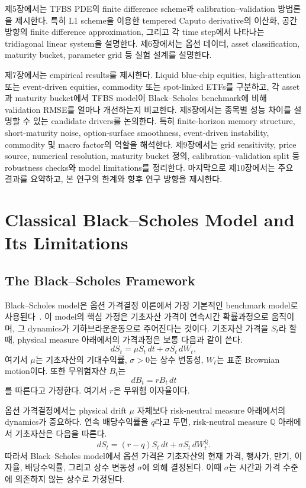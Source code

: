 \documentclass[11pt,a4paper]{report}
\begin{document}
제5장에서는 TFBS PDE의 finite difference scheme과 calibration--validation 방법론을 제시한다. 특히 L1 scheme을 이용한 tempered Caputo derivative의 이산화, 공간 방향의 finite difference approximation, 그리고 각 time step에서 나타나는 tridiagonal linear system을 설명한다. 제6장에서는 옵션 데이터, asset classification, maturity bucket, parameter grid 등 실험 설계를 설명한다.

제7장에서는 empirical results를 제시한다. Liquid blue-chip equities, high-attention 또는 event-driven equities, commodity 또는 spot-linked ETFs를 구분하고, 각 asset과 maturity bucket에서 TFBS model이 Black--Scholes benchmark에 비해 validation RMSE를 얼마나 개선하는지 비교한다. 제8장에서는 종목별 성능 차이를 설명할 수 있는 candidate drivers를 논의한다. 특히 finite-horizon memory structure, short-maturity noise, option-surface smoothness, event-driven instability, commodity 및 macro factor의 역할을 해석한다. 제9장에서는 grid sensitivity, price source, numerical resolution, maturity bucket 정의, calibration--validation split 등 robustness checks와 model limitations를 정리한다. 마지막으로 제10장에서는 주요 결과를 요약하고, 본 연구의 한계와 향후 연구 방향을 제시한다.

\chapter{Classical Black--Scholes Model and Its Limitations}

\section{The Black--Scholes Framework}

Black--Scholes model은 옵션 가격결정 이론에서 가장 기본적인 benchmark model로 사용된다~\cite{BlackScholes1973,Merton1973}. 이 model의 핵심 가정은 기초자산 가격이 연속시간 확률과정으로 움직이며, 그 dynamics가 기하브라운운동으로 주어진다는 것이다. 기초자산 가격을 $S_t$라 할 때, physical measure 아래에서의 가격과정은 보통 다음과 같이 쓴다.
\[
dS_t = \mu S_t\,dt + \sigma S_t\,dW_t,
\]
여기서 $\mu$는 기초자산의 기대수익률, $\sigma>0$는 상수 변동성, $W_t$는 표준 Brownian motion이다. 또한 무위험자산 $B_t$는
\[
dB_t = rB_t\,dt
\]
를 따른다고 가정한다. 여기서 $r$은 무위험 이자율이다.

옵션 가격결정에서는 physical drift $\mu$ 자체보다 risk-neutral measure 아래에서의 dynamics가 중요하다. 연속 배당수익률을 $q$라고 두면, risk-neutral measure $\mathbb{Q}$ 아래에서 기초자산은 다음을 따른다.
\[
dS_t = (r-q)S_t\,dt + \sigma S_t\,dW_t^{\mathbb{Q}}.
\]
따라서 Black--Scholes model에서 옵션 가격은 기초자산의 현재 가격, 행사가, 만기, 이자율, 배당수익률, 그리고 상수 변동성 $\sigma$에 의해 결정된다. 이때 $\sigma$는 시간과 가격 수준에 의존하지 않는 상수로 가정된다.
\end{document}
